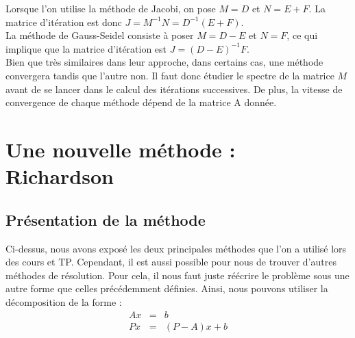 Lorsque l'on utilise la méthode de Jacobi, on pose $M = D$ et $N = E+F$. La matrice d'itération est donc $J = M^{-1}N = D^{-1}(E+F)$.\\

La méthode de Gauss-Seidel consiste à poser $M = D-E$ et $N = F$, ce qui implique que la matrice d'itération est $J = (D-E)^{-1}F$.\\

Bien que très similaires dans leur approche, dans certains cas, une méthode convergera tandis que l'autre non. Il faut donc étudier le spectre de la matrice $M$ avant de se lancer dans le calcul des itérations successives. De plus, la vitesse de convergence de chaque méthode dépend de la matrice A donnée.



\section{Une nouvelle méthode : Richardson}
\subsection{Présentation de la méthode}
Ci-dessus, nous avons exposé les deux principales méthodes que l'on a utilisé lors des cours et TP. Cependant, il est aussi possible pour nous de trouver d'autres méthodes de résolution. Pour cela, il nous faut juste réécrire le problème sous une autre forme que celles précédemment définies. Ainsi, nous pouvons utiliser la décomposition de la forme :  
\begin{eqnarray}
Ax &=& b\\
Px &=& (P - A)x + b
\end{eqnarray}

